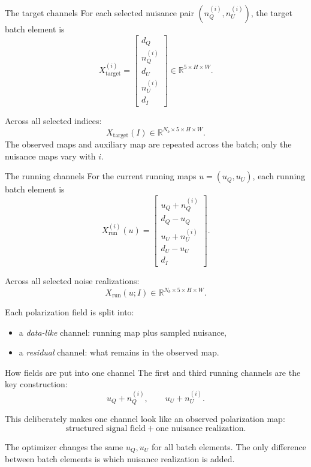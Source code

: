 \documentclass[aspectratio=169,11pt]{beamer}
\begin{document}
\begin{frame}[fragile]{The target channels}
For each selected nuisance pair $(n_Q^{(i)},n_U^{(i)})$, the target batch element is
\[
  X_{\mathrm{target}}^{(i)}
  =
  \begin{bmatrix}
    d_Q\\
    n_Q^{(i)}\\
    d_U\\
    n_U^{(i)}\\
    d_I
\end{bmatrix}
  \in \mathbb{R}^{5\times H\times W}.
\]

\vspace{0.25em}
Across all selected indices:
\[
  X_{\mathrm{target}}(I)\in\mathbb{R}^{N_b\times5\times H\times W}.
\]
The observed maps and auxiliary map are repeated across the batch; only the nuisance maps vary with $i$.
\end{frame}

\begin{frame}[fragile]{The running channels}
For the current running maps $u=(u_Q,u_U)$, each running batch element is
\[
  X_{\mathrm{run}}^{(i)}(u)
  =
  \begin{bmatrix}
    u_Q+n_Q^{(i)}\\
    d_Q-u_Q\\
    u_U+n_U^{(i)}\\
    d_U-u_U\\
    d_I
  \end{bmatrix}.
\]

\vspace{0.25em}
Across all selected noise realizations:
\[
  X_{\mathrm{run}}(u;I)\in\mathbb{R}^{N_b\times5\times H\times W}.
\]

\vspace{0.25em}
Each polarization field is split into:
\begin{itemize}
  \item a \emph{data-like} channel: running map plus sampled nuisance,
  \item a \emph{residual} channel: what remains in the observed map.
\end{itemize}
\end{frame}

\begin{frame}[fragile]{How fields are put into one channel}
The first and third running channels are the key construction:
\[
  u_Q+n_Q^{(i)},\qquad
  u_U+n_U^{(i)}.
\]

\vspace{0.25em}
This deliberately makes one channel look like an observed polarization map:
\[
  \text{structured signal field} + \text{one nuisance realization}.
\]

\vspace{0.25em}
The optimizer changes the same $u_Q,u_U$ for all batch elements.
The only difference between batch elements is which nuisance realization is added.
\end{frame}
\end{document}
